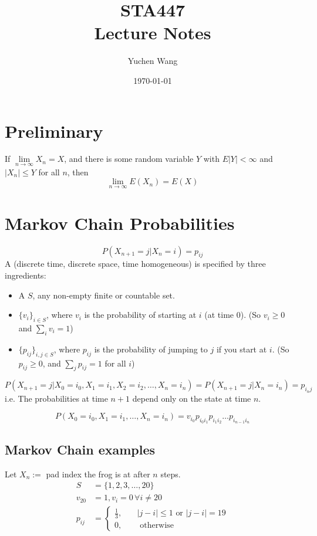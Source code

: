\documentclass[11pt]{article}
\title{STA447\\ Lecture Notes}
\author{Yuchen Wang}
\date{\today}
\renewcommand{\limit}[1]{\underset{{#1} \rightarrow \infty}{\lim}}
\begin{document}
    \maketitle
    \tableofcontents
    \newpage
    \section{Preliminary}
    If $\limit{n} X_n = X$, and there is some random variable $Y$ with $E|Y|<\infty$ and $|X_n| \leq Y$ for all $n$, then $$\limit{n} E(X_n) = E(X)$$


    \section{Markov Chain Probabilities}
    \notation
    $$P(X_{n+1} = j | X_n = i) = p_{ij}$$
     A (discrete time, discrete space, time homogeneous)  is specified by three ingredients:
    \begin{itemize}
    	\item A  $S$, any non-empty finite or countable set.
    	\item {} $\{v_i\}_{i \in S}$, where $v_i$ is the probability of starting at $i$ (at time 0). (So $v_i \geq 0$ and $\sum_i v_i = 1$)
    	\item {} $\{p_{ij}\}_{i, j\in S}$, where $p_{ij}$ is the probability of jumping to $j$ if you start at $i$. (So $p_{ij} \geq 0$, and $\sum_j p_{ij} = 1$ for all $i$)
    \end{itemize}
    
    $$P(X_{n+1} = j | X_0 = i_0, X_1 = i_1, X_2 = i_2, \hdots, X_n = i_n) = P(X_{n+1} = j | X_n = i_n) = p_{i_nj}$$
    i.e. The probabilities at time $n+1$ depend only on the state at time $n$.
    
    \remark
    $$P(X_0 = i_0, X_1 = i_1, \hdots, X_n = i_n) = v_{i_0}p_{i_0i_1}p_{i_1i_2} \hdots p_{i_{n-1}i_n}$$
    
    \subsection{Markov Chain examples}
    Let $X_n :=$ pad index the frog is at after $n$ steps.
    \begin{align*}
    	S &= \{1, 2, 3, \hdots, 20\}\\
    	v_{20} &= 1, v_i = 0 \, \forall i \neq 20 \\
    	p_{ij} &= \begin{cases}
    		\frac{1}{3}, \quad &|j - i| \leq 1 \text{ or } |j - i| = 19\\
    	0, \quad &\text{ otherwise }
    	\end{cases}
    \end{align*}
    
\end{document}
